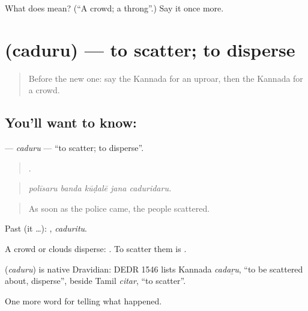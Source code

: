\begin{tcolorbox}[breakable,colback=teal!4,colframe=teal!35!black,title={Before you move on}]
What does  mean? (\textquotedblleft{}A crowd; a throng\textquotedblright{}.) Say it once more.
\end{tcolorbox}
\section[\texorpdfstring{\kn{ಚದುರು} (caduru)}{ಚದುರು (caduru)}]{ (caduru) — to scatter; to disperse}

\label{lesson:KA-C339-caduru}



\begin{quote}
Before the new one: say the Kannada for an uproar, then the Kannada for a crowd.
\end{quote}

\subsection*{You'll want to know: }
\textbf{} — \emph{caduru} — \textquotedblleft{}to scatter; to disperse\textquotedblright{}.

\begin{quote}
    .
\end{quote}

\begin{quote}
\emph{polīsaru banda kūḍalē jana caduridaru.}
\end{quote}

\begin{quote}
As soon as the police came, the people scattered.
\end{quote}

Past (it …): , \emph{caduritu}.

A crowd or clouds disperse:  . To scatter them is .

\begin{cousinweb}
\textbf{} (\emph{caduru}) is native Dravidian: DEDR 1546 lists Kannada \emph{cadaṟu}, \textquotedblleft{}to be scattered about, disperse\textquotedblright{}, beside Tamil \emph{citar}, \textquotedblleft{}to scatter\textquotedblright{}.
\end{cousinweb}

\begin{grammarlens}[title={What you've built}]
One more word for telling what happened.
\end{grammarlens}

